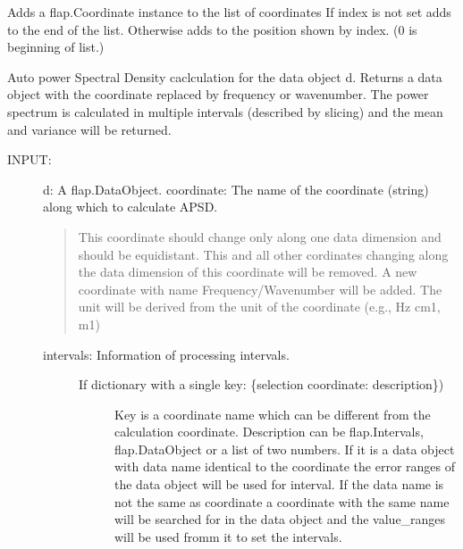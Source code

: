 \documentclass[letterpaper,10pt,english]{sphinxmanual}
\begin{document}
\begin{fulllineitems}
\begin{fulllineitems}
\label{\detokenize{data_object:flap.data_object.DataObject.add_coordinate_object}}
Adds a flap.Coordinate instance to the list of coordinates
If index is not set adds to the end of the list. Otherwise adds to the position
shown by index. (0 is beginning of list.)

\end{fulllineitems}


\begin{fulllineitems}
\label{\detokenize{data_object:flap.data_object.DataObject.apsd}}
Auto power Spectral Density caclculation for the data object d.
Returns a data object with the coordinate replaced by frequency or wavenumber.
The power spectrum is calculated in multiple intervals (described by slicing)
and the mean and variance will be returned.
\begin{description}
\item[{INPUT:}] \leavevmode
d: A flap.DataObject.
coordinate: The name of the coordinate (string) along which to calculate APSD.
\begin{quote}

This coordinate should change only along one data dimension and should be equidistant.
This and all other cordinates changing along the data dimension of
this coordinate will be removed. A new coordinate with name
Frequency/Wavenumber will be added. The unit will be
derived from the unit of the coordinate (e.g., Hz cm\sphinxhyphen{}1, m\sphinxhyphen{}1)
\end{quote}
\begin{description}
\item[{intervals: Information of processing intervals.}] \leavevmode\begin{description}
\item[{If dictionary with a single key: \{selection coordinate: description\})}] \leavevmode
Key is a coordinate name which can be different from the calculation
coordinate.
Description can be flap.Intervals, flap.DataObject or
a list of two numbers. If it is a data object with data name identical to
the coordinate the error ranges of the data object will be used for
interval. If the data name is not the same as coordinate a coordinate with the
same name will be searched for in the data object and the value\_ranges
will be used fromm it to set the intervals.


\end{description}
\end{description}
\end{description}
\end{fulllineitems}
\end{fulllineitems}
\end{document}
